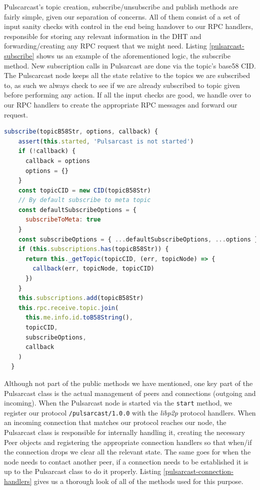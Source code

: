 Pulscarcast's topic creation, subscribe/unsubscribe and publish methods are
fairly simple, given our separation of concerns. All of them consist of a set
of input sanity checks with control in the end being handover to our RPC
handlers, responsible for storing any relevant information in the DHT and
forwarding/creating any RPC request that we might need. Listing
\ref{pulsarcast-subscribe} shows us an example of the aforementioned logic, the
subscribe method. New subscription calls in Pulsarcast are done via the topic's
base58 CID. The Pulscarcast node keeps all the state relative to the topics we
are subscribed to, as such we always check to see if we are already subscribed
to topic given before performing any action. If all the input checks are good,
we handle over to our RPC handlers to create the appropriate RPC messages and
forward our request.

\begin{lstlisting}[language=JavaScript, float, caption={Pulsarcast class subscribe method},label={pulsarcast-subscribe}]
  subscribe(topicB58Str, options, callback) {
    assert(this.started, 'Pulsarcast is not started')
    if (!callback) {
      callback = options
      options = {}
    }
    const topicCID = new CID(topicB58Str)
    // By default subscribe to meta topic
    const defaultSubscribeOptions = {
      subscribeToMeta: true
    }
    const subscribeOptions = { ...defaultSubscribeOptions, ...options }
    if (this.subscriptions.has(topicB58Str)) {
      return this._getTopic(topicCID, (err, topicNode) => {
        callback(err, topicNode, topicCID)
      })
    }
    this.subscriptions.add(topicB58Str)
    this.rpc.receive.topic.join(
      this.me.info.id.toB58String(),
      topicCID,
      subscribeOptions,
      callback
    )
  }
\end{lstlisting}

Although not part of the public methods we have mentioned, one key part of the
Pulsarcast class is the actual management of peers and connections (outgoing
and incoming). When the Pulsarcast node is started via the \verb|start| method,
we register our protocol \verb|/pulsarcast/1.0.0| with the \emph{libp2p}
protocol handlers. When an incoming connection that matches our protocol
reaches our node, the Pulsarcast class is responsible for internally handling
it, creating the necessary Peer objects and registering the appropriate
connection handlers so that when/if the connection drops we clear all the
relevant state. The same goes for when the node needs to contact another peer,
if a connection needs to be established it is up to the Pulsarcast class to do
it properly. Listing \ref{pulsarcast-connection-handlers} gives us a thorough
look of all of the methods used for this purpose.

